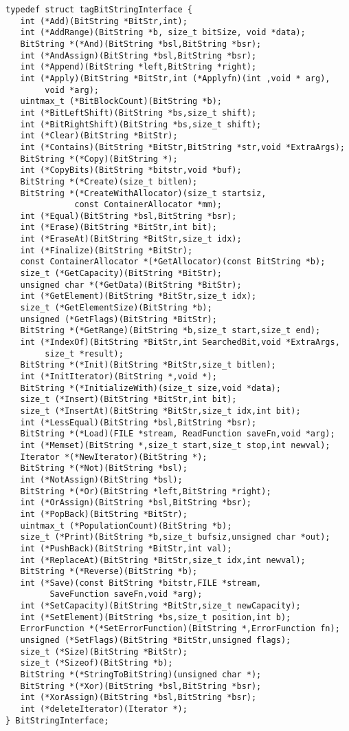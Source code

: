 \begin{verbatim}
typedef struct tagBitStringInterface {
   int (*Add)(BitString *BitStr,int);
   int (*AddRange)(BitString *b, size_t bitSize, void *data);
   BitString *(*And)(BitString *bsl,BitString *bsr);
   int (*AndAssign)(BitString *bsl,BitString *bsr);
   int (*Append)(BitString *left,BitString *right);
   int (*Apply)(BitString *BitStr,int (*Applyfn)(int ,void * arg),
        void *arg);
   uintmax_t (*BitBlockCount)(BitString *b);
   int (*BitLeftShift)(BitString *bs,size_t shift);
   int (*BitRightShift)(BitString *bs,size_t shift);
   int (*Clear)(BitString *BitStr);
   int (*Contains)(BitString *BitStr,BitString *str,void *ExtraArgs);
   BitString *(*Copy)(BitString *);
   int (*CopyBits)(BitString *bitstr,void *buf);
   BitString *(*Create)(size_t bitlen);
   BitString *(*CreateWithAllocator)(size_t startsiz,
              const ContainerAllocator *mm);
   int (*Equal)(BitString *bsl,BitString *bsr);
   int (*Erase)(BitString *BitStr,int bit);
   int (*EraseAt)(BitString *BitStr,size_t idx);
   int (*Finalize)(BitString *BitStr);
   const ContainerAllocator *(*GetAllocator)(const BitString *b);
   size_t (*GetCapacity)(BitString *BitStr);
   unsigned char *(*GetData)(BitString *BitStr);
   int (*GetElement)(BitString *BitStr,size_t idx);
   size_t (*GetElementSize)(BitString *b);
   unsigned (*GetFlags)(BitString *BitStr); 
   BitString *(*GetRange)(BitString *b,size_t start,size_t end);
   int (*IndexOf)(BitString *BitStr,int SearchedBit,void *ExtraArgs,
        size_t *result);
   BitString *(*Init)(BitString *BitStr,size_t bitlen);
   int (*InitIterator)(BitString *,void *);
   BitString *(*InitializeWith)(size_t size,void *data);
   size_t (*Insert)(BitString *BitStr,int bit);
   size_t (*InsertAt)(BitString *BitStr,size_t idx,int bit);
   int (*LessEqual)(BitString *bsl,BitString *bsr);
   BitString *(*Load)(FILE *stream, ReadFunction saveFn,void *arg);
   int (*Memset)(BitString *,size_t start,size_t stop,int newval);
   Iterator *(*NewIterator)(BitString *);
   BitString *(*Not)(BitString *bsl);
   int (*NotAssign)(BitString *bsl);
   BitString *(*Or)(BitString *left,BitString *right);
   int (*OrAssign)(BitString *bsl,BitString *bsr);
   int (*PopBack)(BitString *BitStr);
   uintmax_t (*PopulationCount)(BitString *b);
   size_t (*Print)(BitString *b,size_t bufsiz,unsigned char *out);
   int (*PushBack)(BitString *BitStr,int val);
   int (*ReplaceAt)(BitString *BitStr,size_t idx,int newval);
   BitString *(*Reverse)(BitString *b);
   int (*Save)(const BitString *bitstr,FILE *stream,
         SaveFunction saveFn,void *arg);
   int (*SetCapacity)(BitString *BitStr,size_t newCapacity);
   int (*SetElement)(BitString *bs,size_t position,int b);
   ErrorFunction *(*SetErrorFunction)(BitString *,ErrorFunction fn);
   unsigned (*SetFlags)(BitString *BitStr,unsigned flags);
   size_t (*Size)(BitString *BitStr); 
   size_t (*Sizeof)(BitString *b);
   BitString *(*StringToBitString)(unsigned char *);
   BitString *(*Xor)(BitString *bsl,BitString *bsr);
   int (*XorAssign)(BitString *bsl,BitString *bsr);
   int (*deleteIterator)(Iterator *);
} BitStringInterface;
\end{verbatim}
